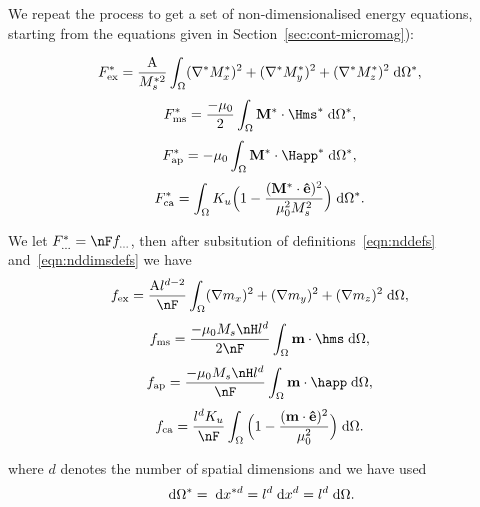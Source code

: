 We repeat the process to get a set of non-dimensionalised energy equations, starting from the equations given in Section~\ref{sec:cont-micromag}):

\begin{equation}
  F_\text{ex}^* =  \frac{\text{A}}{M_s^{*2}} \int_{\Omega} (\nabla^* M_x^*)^2  + (\nabla^* M_y^*)^2  + (\nabla^* M_z^*)^2 {\; \text{d}} \Omega^*,
\end{equation}
\begin{equation}
  F_\text{ms}^* =  \frac{-\mu_0}{2} \int_{\magd} \Mv^* \cdot \Hms^* \d \magd^*,
\end{equation}
\begin{equation}
  F_\text{ap}^* = - \mu_0 \int_{\magd} \Mv^* \cdot \Happ^* \d \magd^*,
\end{equation}
\begin{equation}
  F_\text{ca}^* = \int_\Omega K_u \Big( 1 - \frac{(\mathbf{M}^* \cdot \mathbf{\hat{e}})^2}{\mu_0^2 M_s^2} \Big) {\; \text{d}} \Omega^*.
\end{equation}

We let $F_\text{...}^* = \nF f_\text{...}$, then after subsitution of definitions~\eqref{eqn:nddefs} and~\eqref{eqn:nddimsdefs} we have
\begin{equation}
  f_\text{ex} =  \frac{\Exchc l^{d-2}}{\nF} \int_{\magd} (\nabla m_x)^2  + (\nabla m_y)^2  + (\nabla m_z)^2 \d \magd,
\end{equation}
\begin{equation}
  f_\text{ms} = \frac{-\mu_0 M_s \nH l^d}{2\nF} \int_{\magd} \mv \cdot \hms \d \magd,
\end{equation}
\begin{equation}
  f_\text{ap} = \frac{- \mu_0 M_s \nH l^d}{\nF} \int_{\magd} \mv \cdot \happ \d \magd,
\end{equation}
\begin{equation}
  f_\text{ca} = \frac{l^d K_u}{\nF} \int_\magd \Big( 1 - \frac{(\mv \cdot \ev)^2}{\mu_0^2} \Big) \d \magd.
\end{equation}

where $d$ denotes the number of spatial dimensions and we have used 
\begin{equation} 
  {\; \text{d}} \Omega^* = {\; \text{d}} x^{*d} = l^d {\; \text{d}} x^d = l^d {\; \text{d}} \Omega.
\end{equation}


